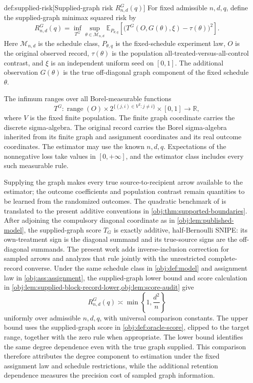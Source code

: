 \begin{definitionv}{def:supplied-risk}[Supplied-graph risk $R^G_{n,d}(q)$]
For fixed admissible \(n,d,q\), define the supplied-graph minimax squared risk by
\[
R^G_{n,d}(q)=
\inf_{T^G}\sup_{\theta\in\mathcal M_{n,d}}
\mathbb E_{P_{\theta,q}}
\left[
\bigl(T^G(O,G(\theta),\xi)-\tau(\theta)\bigr)^2
\right].
\]
Here \(\mathcal M_{n,d}\) is the schedule class, \(P_{\theta,q}\) is the fixed-schedule experiment law, \(O\) is the original observed record, \(\tau(\theta)\) is the population all-treated-versus-all-control contrast, and \(\xi\) is an independent uniform seed on \([0,1]\). The additional observation \(G(\theta)\) is the true off-diagonal graph component of the fixed schedule \(\theta\).

The infimum ranges over all Borel-measurable functions
\[
T^G:
\operatorname{range}(O)\times
2^{\{(j,i)\in V^2:j\ne i\}}\times[0,1]
\longrightarrow\mathbb R,
\]
where \(V\) is the fixed finite population. The finite graph coordinate carries the discrete sigma-algebra. The original record carries the Borel sigma-algebra inherited from its finite graph and assignment coordinates and its real outcome coordinates. The estimator may use the known \(n,d,q\). Expectations of the nonnegative loss take values in \([0,+\infty]\), and the estimator class includes every such measurable rule.
\end{definitionv}

Supplying the graph makes every true source-to-recipient arrow available to the estimator; the outcome coefficients and population contrast remain quantities to be learned from the randomized outcomes. The quadratic benchmark of \citet[Theorem \texttt{thm:degree-frontier}; non-archival research note]{CausalSmithKnownGraph2026} is translated to the present additive conventions in \cref{obj:thm:supported-boundaries}. After adjoining the compulsory diagonal coordinate as in \cref{obj:lem:published-model}, the supplied-graph score \(T_G\) is exactly additive, half-Bernoulli SNIPE: its own-treatment sign is the diagonal summand and its true-source signs are the off-diagonal summands. The present work adds inverse-inclusion correction for sampled arrows and analyzes that rule jointly with the unrestricted complete-record converse. Under the same schedule class in \cref{obj:def:model} and assignment law in \cref{obj:ass:assignment}, the supplied-graph lower bound and score calculation in \cref{obj:lem:supplied-block-record-lower,obj:lem:score-audit} give
\[
R^G_{n,d}(q)\asymp \min\left\{1,\frac{d^2}{n}\right\}
\]
uniformly over admissible \(n,d,q\), with universal comparison constants. The upper bound uses the supplied-graph score in \cref{obj:def:oracle-score}, clipped to the target range, together with the zero rule when appropriate. The lower bound identifies the same degree dependence even with the true graph supplied. This comparison therefore attributes the degree component to estimation under the fixed assignment law and schedule restrictions, while the additional retention dependence measures the precision cost of sampled graph information.

